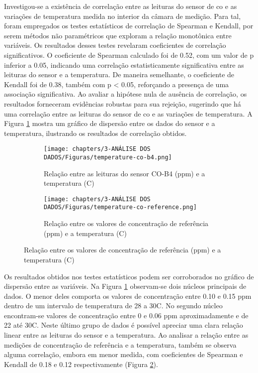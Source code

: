 Investigou-se a existência de correlação entre as leituras do sensor de \acrshort{co} e as variações de temperatura medida no interior da câmara de medição. Para tal, foram empregados os testes estatísticos de correlação de Spearman e Kendall, por serem métodos não paramétricos que exploram a relação monotônica entre variáveis. Os resultados desses testes revelaram coeficientes de correlação significativos. O coeficiente de Spearman calculado foi de 0.52, com um valor de p inferior a 0.05, indicando uma correlação estatisticamente significativa entre as leituras do sensor e a temperatura. De maneira semelhante, o coeficiente de Kendall foi de 0.38, também com p < 0.05, reforçando a presença de uma associação significativa. Ao avaliar a hipótese nula de ausência de correlação, os resultados forneceram evidências robustas para sua rejeição, sugerindo que há uma correlação entre as leituras do sensor de \acrshort{co} e as variações de temperatura. A Figura \ref{fig:data-temp-co-corr} mostra um gráfico de dispersão entre os dados do sensor e a temperatura, ilustrando os resultados de correlação obtidos. 

\begin{figure}[h]
    \centering
    \caption{Relação dos dados de concentração de \acrshort{co} com a temperatura}
    \begin{subfigure}{0.4\textwidth}
        \texttt{[image: chapters/3-ANÁLISE DOS DADOS/Figuras/temperature-co-b4.png]}
        \caption{Relação entre as leituras do sensor CO-B4 (ppm) e a temperatura (\textdegree C)}
        \label{fig:data-temp-co-corr}
    \end{subfigure}
    \hfill
    \begin{subfigure}{0.4\textwidth}
        \texttt{[image: chapters/3-ANÁLISE DOS DADOS/Figuras/temperature-co-reference.png]}
        \caption{Relação entre os valores de concentração de referência (ppm) e a temperatura (\textdegree C)}
        \label{fig:data-temp-co-ref-corr}
    \end{subfigure}
    \hfill
    \label{fig:data-co-temp}
\end{figure}

Os resultados obtidos nos testes estatísticos podem ser corroborados no gráfico de dispersão entre as variáveis. Na Figura \ref{fig:data-temp-co-corr} observam-se dois núcleos principais de dados. O menor deles comporta os valores de concentração entre 0.10 e 0.15 ppm dentro de um intervalo de temperatura de 28 a 30\textdegree C. No segundo núcleo encontram-se valores de concentração entre 0 e 0.06 ppm aproximadamente e de 22 até 30\textdegree C. Neste último grupo de dados é possível apreciar uma clara relação linear entre as leituras do sensor e a temperatura. Ao analisar a relação entre as medições de concentração de referência e a temperatura, também se observa alguma correlação, embora em menor medida, com coeficientes de Spearman e Kendall de 0.18 e 0.12 respectivamente (Figura \ref{fig:data-temp-co-ref-corr}).

